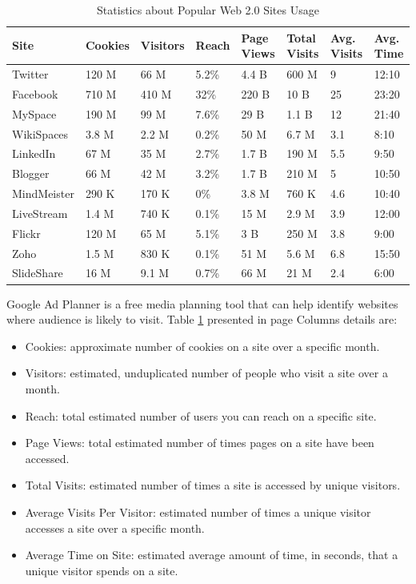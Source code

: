 \documentclass[12pt,a4paper,final,twoside,onecolumn,titlepage]{book}
\begin{document}
\begin{table}
\begin{center}
\caption{Statistics about Popular Web 2.0 Sites Usage}
\begin{tabularx}{\textwidth}{|l|X|X|X|X|X|X|X|}
\hline Site & Cookies & Visitors & Reach & Page Views & Total Visits & Avg. Visits & Avg. Time \\
\hline Twitter & 120 M	 & 66 M & 5.2\% & 4.4 B & 600 M & 9 & 12:10 \\
\hline Facebook & 710 M	 & 410 M & 32\%	& 220 B & 10 B &	25 & 23:20\\
\hline MySpace & 190 M	& 99 M	& 7.6\%  & 29 B & 1.1 B & 12 & 21:40 \\
\hline WikiSpaces	 & 3.8 M & 2.2 M & 0.2\%	 & 50 M & 6.7 M & 3.1	& 8:10 \\
\hline LinkedIn & 67 M & 35 M & 2.7\% & 1.7 B & 190 M & 5.5 & 9:50 \\
\hline Blogger	& 66 M	& 42 M	& 3.2\% & 1.7 B & 210 M & 5 & 10:50 \\
\hline MindMeister & 290 K & 170 K & 0\%	& 3.8 M & 760 K & 4.6 & 10:40\\
\hline LiveStream & 1.4 M & 740 K & 0.1\%	 & 15 M & 2.9 M & 3.9 & 12:00\\
\hline Flickr	& 120 M & 65 M & 5.1\% & 3 B & 250 M & 3.8 &	9:00\\
\hline Zoho & 1.5 M & 830 K & 0.1\% & 51 M & 5.6 M & 6.8 & 15:50\\
\hline SlideShare & 16 M & 9.1 M & 0.7\% & 66 M & 21 M & 2.4 & 6:00\\
\hline
\end{tabularx}
\end{center}
\label{Web2-T1}
\end{table}

Google Ad Planner is a free media planning tool that can help identify websites where audience is likely to visit. Table \ref{Web2-T1} presented in page \pageref{Web2-T1} Columns details are:
\begin{itemize}
\item Cookies: approximate number of cookies on a site over a specific month.
\item Visitors: estimated, unduplicated number of people who visit a site over a month.
\item Reach: total estimated number of users you can reach on a specific site.
\item Page Views: total estimated number of times pages on a site have been accessed.
\item Total Visits: estimated number of times a site is accessed by unique visitors.
\item Average Visits Per Visitor: estimated number of times a unique visitor accesses a site over a specific month.
\item Average Time on Site: estimated average amount of time, in seconds, that a unique visitor spends on a site.
\end{itemize}
\end{document}
